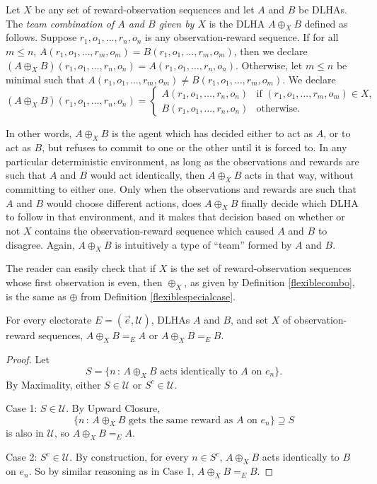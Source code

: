 \documentclass[twoside,11pt]{article}
\begin{document}
\begin{definition}
\label{flexiblecombo}
    Let $X$ be any set of reward-observation sequences and let $A$ and $B$ be DLHAs.
    The \emph{team combination of $A$ and $B$ given by $X$} is the DLHA
    $A\oplus_X B$ defined as follows.
    Suppose $r_1,o_1,\ldots,r_n,o_n$ is any observation-reward sequence.
    If for all $m\leq n$, $A(r_1,o_1,\ldots,r_m,o_m)=B(r_1,o_1,\ldots,r_m,o_m)$,
    then we declare $(A\oplus_X B)(r_1,o_1,\ldots,r_n,o_n)=A(r_1,o_1,\ldots,r_n,o_n)$.
    Otherwise, let $m\leq n$ be minimal such that
    $A(r_1,o_1,\ldots,r_m,o_m)\neq B(r_1,o_1,\ldots,r_m,o_m)$.
    We declare
    \[
        (A\oplus_X B)(r_1,o_1,\ldots,r_n,o_n) =
        \begin{cases}
            A(r_1,o_1,\ldots,r_n,o_n) & \mbox{if $(r_1,o_1,\ldots,r_m,o_m)\in X$},\\
            B(r_1,o_1,\ldots,r_n,o_n) & \mbox{otherwise}.
        \end{cases}
    \]
\end{definition}

In other words, $A\oplus_X B$ is the agent which has decided either to act as $A$,
or to act as $B$, but refuses to commit to one or the other until it is forced to.
In any particular deterministic environment, as long as the observations and
rewards are such that
$A$ and $B$ would act identically, then $A\oplus_X B$ acts in that way, without
committing to either one. Only when the observations and rewards are such that $A$
and $B$ would choose different actions, does $A\oplus_X B$ finally decide which DLHA
to follow in that environment, and it makes that decision based on whether or not
$X$ contains the observation-reward sequence which caused $A$ and $B$ to disagree.
Again, $A\oplus_X B$ is intuitively a type of ``team'' formed by $A$ and $B$.

The reader can easily check that if $X$ is the set of reward-observation sequences whose first
observation is even, then $\oplus_X$, as given by Definition \ref{flexiblecombo},
is the same as $\oplus$ from Definition \ref{flexiblespecialcase}.

\begin{proposition}
\label{splittingproposition}
    For every electorate $E=(\vec{e},\mathscr U)$, DLHAs $A$ and $B$, and set $X$ of
    observation-reward sequences,
    $A\oplus_X B =_{E} A$ or $A\oplus_X B =_{E}B$.
\end{proposition}

\begin{proof}
    Let
    \[
        S = \{n\,:\,\mbox{$A\oplus_X B$ acts identically to $A$ on $e_n$}\}.
    \]
    By Maximality, either $S\in\mathscr U$ or $S^c\in\mathscr U$.

    Case 1: $S\in\mathscr U$.
    By Upward Closure,
    \[
        \{n\,:\,\mbox{$A\oplus_X B$ gets the same reward as $A$ on $e_n$}\}
        \supseteq
        S
    \]
    is also in $\mathscr U$, so $A\oplus_X B =_{E} A$.

    Case 2: $S^c\in\mathscr U$.
    By construction, for every $n\in S^c$, $A\oplus_X B$ acts identically to $B$ on $e_n$.
    So by similar reasoning as in Case 1, $A\oplus_X B =_{E} B$.
\end{proof}
\end{document}
